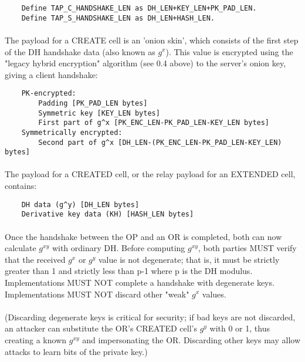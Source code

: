 \begin{verbatim}
    Define TAP_C_HANDSHAKE_LEN as DH_LEN+KEY_LEN+PK_PAD_LEN.
    Define TAP_S_HANDSHAKE_LEN as DH_LEN+HASH_LEN.
\end{verbatim}

\paragraph{}
The payload for a CREATE cell is an 'onion skin', which consists of
the first step of the DH handshake data (also known as $g^x$). This
value is encrypted using the "legacy hybrid encryption" algorithm
(see 0.4 above) to the server's onion key, giving a client handshake:

\begin{verbatim}
    PK-encrypted:
        Padding [PK_PAD_LEN bytes]
        Symmetric key [KEY_LEN bytes]
        First part of g^x [PK_ENC_LEN-PK_PAD_LEN-KEY_LEN bytes]
    Symmetrically encrypted:
        Second part of g^x [DH_LEN-(PK_ENC_LEN-PK_PAD_LEN-KEY_LEN) bytes]
\end{verbatim}

\paragraph{}
The payload for a CREATED cell, or the relay payload for an
EXTENDED cell, contains:

\begin{verbatim}
    DH data (g^y) [DH_LEN bytes]
    Derivative key data (KH) [HASH_LEN bytes]
\end{verbatim}

\paragraph{}
Once the handshake between the OP and an OR is completed, both can
now calculate $g^{xy}$ with ordinary DH. Before computing $g^{xy}$, both parties
MUST verify that the received $g^x$ or $g^y$ value is not degenerate;
that is, it must be strictly greater than 1 and strictly less than p-1
where p is the DH modulus. Implementations MUST NOT complete a handshake
with degenerate keys. Implementations MUST NOT discard other "weak"
$g^x$ values.

\paragraph{}
(Discarding degenerate keys is critical for security; if bad keys
are not discarded, an attacker can substitute the OR's CREATED
cell's $g^y$ with 0 or 1, thus creating a known $g^{xy}$ and impersonating
the OR. Discarding other keys may allow attacks to learn bits of
the private key.)


